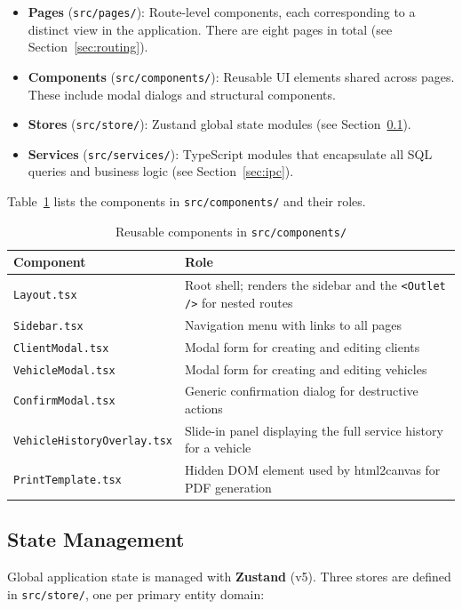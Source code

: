 \documentclass[12pt, a4paper]{report}
\newcommand{\term}[1]{\textbf{\color{Blue}#1}}
\begin{document}
	\begin{itemize}
		\item \textbf{Pages} (\texttt{src/pages/}): Route-level components, each
		      corresponding to a distinct view in the application. There are eight
		      pages in total (see Section~\ref{sec:routing}).
		\item \textbf{Components} (\texttt{src/components/}): Reusable UI elements
		      shared across pages. These include modal dialogs and structural
		      components.
		\item \textbf{Stores} (\texttt{src/store/}): Zustand global state modules
		      (see Section~\ref{sec:state}).
		\item \textbf{Services} (\texttt{src/services/}): TypeScript modules that
		      encapsulate all SQL queries and business logic (see
		      Section~\ref{sec:ipc}).
	\end{itemize}

	Table~\ref{tab:components} lists the components in \texttt{src/components/}
	and their roles.

	\begin{table}[H]
		\centering
		\begin{tabularx}{\textwidth}{l X}
			\toprule
			\textbf{Component}            & \textbf{Role} \\
			\midrule
			\texttt{Layout.tsx}           & Root shell; renders the sidebar and the \texttt{<Outlet />} for nested routes \\
			\texttt{Sidebar.tsx}          & Navigation menu with links to all pages \\
			\texttt{ClientModal.tsx}      & Modal form for creating and editing clients \\
			\texttt{VehicleModal.tsx}     & Modal form for creating and editing vehicles \\
			\texttt{ConfirmModal.tsx}     & Generic confirmation dialog for destructive actions \\
			\texttt{VehicleHistoryOverlay.tsx} & Slide-in panel displaying the full service history for a vehicle \\
			\texttt{PrintTemplate.tsx}    & Hidden DOM element used by html2canvas for PDF generation \\
			\bottomrule
		\end{tabularx}
		\caption{Reusable components in \texttt{src/components/}}
		\label{tab:components}
	\end{table}

	\subsection{State Management}
	\label{sec:state}
	Global application state is managed with \term{Zustand} (v5). Three stores
	are defined in \texttt{src/store/}, one per primary entity domain:
\end{document}
